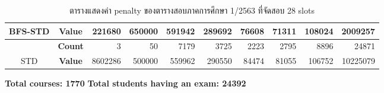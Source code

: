\begin{table}[]
{\begin{tabular}{@{}ccrrrrrrrr@{}}
    \multirow{-2}{*}{{BFS-STD}} & {\textbf{Value}} & {221680}  & {650000} & {591942} & {289692} & {76608}  & {71311}  & {108024} & {2009257}  \\ \midrule
                                                      & {\textbf{Count}} & {3}       & {50}     & {7179}   & {3725}   & {2223}   & {2795}   & {8896}   & {24871}    \\ \cmidrule(l){2-10} 
    \multirow{-2}{*}{STD}     & {\textbf{Value}} & {8602286} & {500000} & {559962} & {290550} & {84474}  & {81055}  & {106752} & {10225079} \\ \bottomrule
    \end{tabular}%
    }
    \caption{ตารางแสดงค่า penalty ของตารางสอบภาคการศึกษา 1/2563 ที่จัดสอบ 28 slots}
    \label{tab:result_table_163_28}
\end{table}
\begin{table}[]
    \centering
    \textbf{Total courses: 1770} \quad \quad \textbf{Total students having an exam: 24392}
\end{table}
